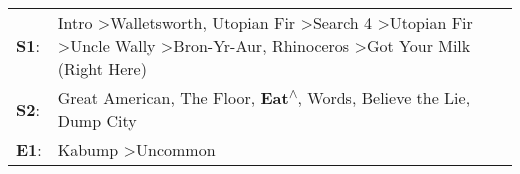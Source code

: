 \begin{supertabular}{p{0.03\textwidth}p{0.92\textwidth}}
 \textbf{S1}:  &  Intro\textsuperscript{} \textgreater \enspace Walletsworth\textsuperscript{}, \enspace Utopian Fir\textsuperscript{} \textgreater \enspace Search 4\textsuperscript{} \textgreater \enspace Utopian Fir\textsuperscript{} \textgreater \enspace Uncle Wally\textsuperscript{} \textgreater \enspace Bron-Yr-Aur\textsuperscript{}, \enspace Rhinoceros\textsuperscript{} \textgreater \enspace Got Your Milk (Right Here)\textsuperscript{}  \enspace  \\
 \textbf{S2}:  &                                                                                                                                                                                                  Great American\textsuperscript{}, \enspace The Floor\textsuperscript{}, \enspace \textbf{Eat\textsuperscript{$\wedge$}}, \enspace Words\textsuperscript{}, \enspace Believe the Lie\textsuperscript{}, \enspace Dump City\textsuperscript{}  \enspace  \\
 \textbf{E1}:  &                                                                                                                                                                                                                                                                                                                                                                    Kabump\textsuperscript{} \textgreater \enspace Uncommon\textsuperscript{}  \enspace  \\
\end{supertabular}
